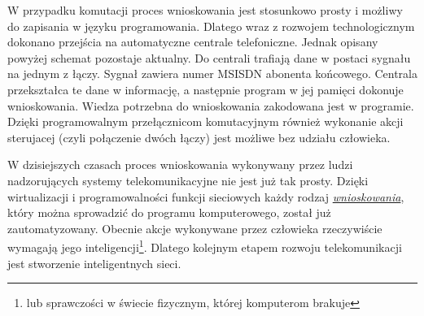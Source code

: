 W przypadku komutacji proces wnioskowania jest stosunkowo prosty i możliwy do zapisania w języku programowania. Dlatego wraz z rozwojem technologicznym dokonano przejścia na automatyczne centrale telefoniczne. Jednak opisany powyżej schemat pozostaje aktualny. Do centrali trafiają dane w postaci sygnału na jednym z łączy. Sygnał zawiera numer MSISDN abonenta końcowego. Centrala przekształca te dane w informację, a następnie program w jej pamięci dokonuje wnioskowania. Wiedza potrzebna do wnioskowania zakodowana jest w programie. Dzięki programowalnym przełącznicom komutacyjnym również wykonanie akcji sterujacej (czyli połączenie dwóch łączy) jest możliwe bez udziału człowieka. 

W dzisiejszych czasach proces wnioskowania wykonywany przez ludzi nadzorujących systemy telekomunikacyjne nie jest już tak prosty. Dzięki wirtualizacji i programowalności funkcji sieciowych każdy rodzaj \hyperlink{def:wnioskowanie}{\textit{wnioskowania}}, który można sprowadzić do programu komputerowego, został już zautomatyzowany. Obecnie akcje wykonywane przez człowieka rzeczywiście wymagają jego inteligencji\footnote{lub sprawczości w świecie fizycznym, której komputerom brakuje}. Dlatego kolejnym etapem rozwoju telekomunikacji jest stworzenie inteligentnych sieci.